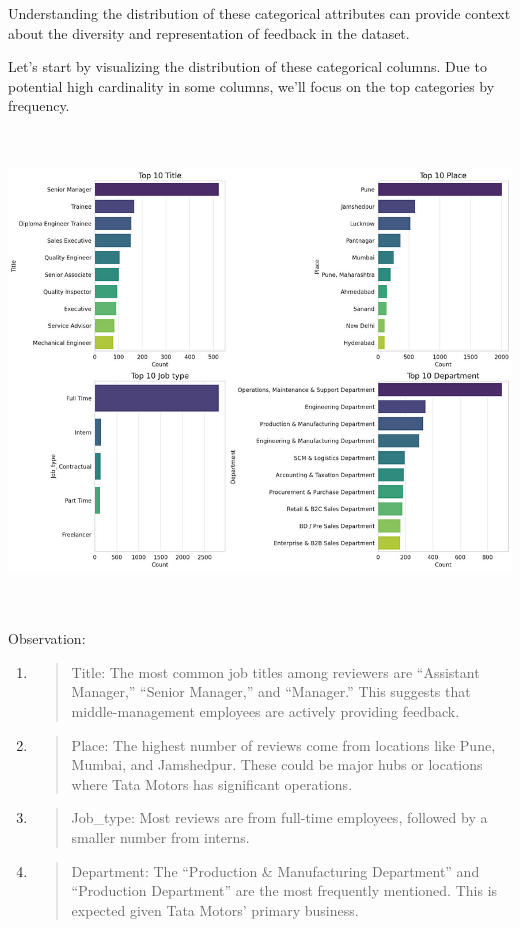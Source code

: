 \documentclass[
]{article}
\begin{document}
Understanding the distribution of these categorical attributes can
provide context about the diversity and representation of feedback in
the dataset.

Let's start by visualizing the distribution of these categorical
columns. Due to potential high cardinality in some columns, we'll focus
on the top categories by frequency.

\includegraphics[width=5.26806in,height=5.00694in]{image4.png}

Observation:

\begin{enumerate}
\def\labelenumi{\arabic{enumi}.}
\item
  \begin{quote}
  Title: The most common job titles among reviewers are ``Assistant
  Manager,'' ``Senior Manager,'' and ``Manager.'' This suggests that
  middle-management employees are actively providing feedback.
  \end{quote}
\item
  \begin{quote}
  Place: The highest number of reviews come from locations like Pune,
  Mumbai, and Jamshedpur. These could be major hubs or locations where
  Tata Motors has significant operations.
  \end{quote}
\item
  \begin{quote}
  Job\_type: Most reviews are from full-time employees, followed by a
  smaller number from interns.
  \end{quote}
\item
  \begin{quote}
  Department: The ``Production \& Manufacturing Department'' and
  ``Production Department'' are the most frequently mentioned. This is
  expected given Tata Motors' primary business.
  \end{quote}
\end{enumerate}
\end{document}
